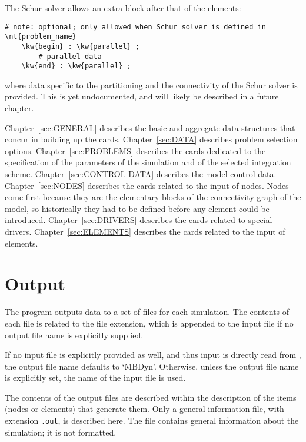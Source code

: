 The Schur solver allows an extra block after that of the elements:
\begin{Verbatim}[commandchars=\\\{\}]
    # note: optional; only allowed when Schur solver is defined in \nt{problem_name}
    \kw{begin} : \kw{parallel} ;
        # parallel data
    \kw{end} : \kw{parallel} ;
\end{Verbatim}
where data specific to the partitioning and the connectivity
of the Schur solver is provided.
This is yet undocumented, and will likely be described 
in a future chapter.

Chapter~\ref{sec:GENERAL} describes the basic and aggregate
data structures that concur in building up the cards.
Chapter~\ref{sec:DATA} describes problem selection options.
Chapter~\ref{sec:PROBLEMS} describes the cards dedicated
to the specification of the parameters of the simulation
and of the selected integration scheme.
Chapter~\ref{sec:CONTROL-DATA} describes the model control data.
Chapter~\ref{sec:NODES} describes the cards related to the input
of nodes.
Nodes come first because they are the elementary blocks 
of the connectivity graph of the model, so historically 
they had to be defined before any element could be introduced.
Chapter~\ref{sec:DRIVERS} describes the cards related 
to special drivers.
Chapter~\ref{sec:ELEMENTS} describes the cards related to the input
of elements.



\section{Output}
The program outputs data to a set of files for each simulation.
The contents of each file is related to the file extension,
which is appended to the input file if no output file name 
is explicitly supplied.

If no input file is explicitly provided as well, and thus input
is directly read from , the output file name defaults
to `MBDyn'.
Otherwise, unless the output file name is explicitly set, the name 
of the input file is used.

The contents of the output files are described within the description
of the items (nodes or elements) that generate them.
Only a general information file, with extension \texttt{.out}, 
is described here. 
The file contains general information about the simulation; 
it is not formatted. 

